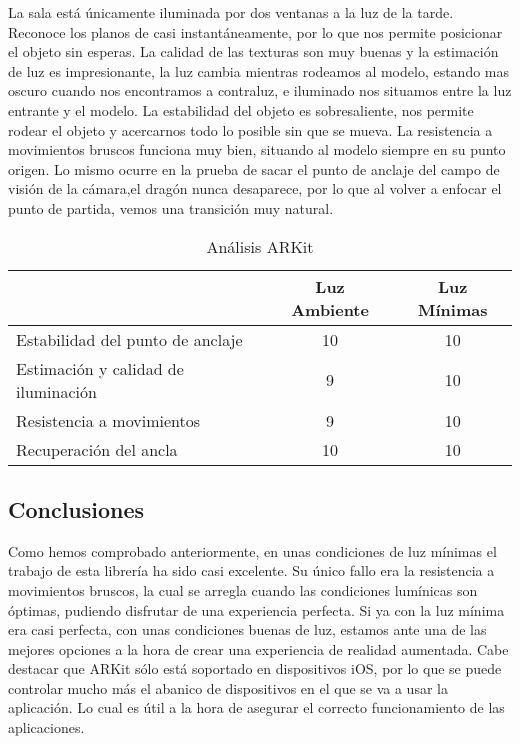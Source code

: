 La sala está únicamente iluminada por dos ventanas a la luz de la tarde.\\
Reconoce los planos de casi instantáneamente, por lo que nos permite posicionar el objeto sin esperas. La calidad de las texturas son muy buenas y la estimación de luz es impresionante, la luz cambia mientras rodeamos al modelo, estando mas oscuro cuando nos encontramos a contraluz, e iluminado nos situamos entre la luz entrante y el modelo. La estabilidad del objeto es sobresaliente, nos permite rodear el objeto y acercarnos todo lo posible sin que se mueva. La resistencia a movimientos bruscos funciona muy bien, situando al modelo siempre en su punto origen. Lo mismo ocurre en la prueba de sacar el punto de anclaje del campo de visión de la cámara,el dragón nunca desaparece, por lo que al volver a enfocar el punto de partida, vemos una transición muy natural.


\begin{table}[H]
    \centering
     \begin{tabular}{|l|c|c|}
    \hline
          & Luz Ambiente & Luz Mínimas \\
         \hline
        Estabilidad del punto de anclaje   &10 &10\\
        \hline
        Estimación y calidad de iluminación  &9 &10 \\
        \hline
        Resistencia a movimientos  &9 &10 \\
        \hline
        Recuperación del ancla  &10 &10 \\
      \hline
    \end{tabular}
    \caption{Análisis ARKit}
    \label{tab:TARKit}
\end{table}

\subsection{Conclusiones}
Como hemos comprobado anteriormente, en unas condiciones de luz mínimas el trabajo de esta librería ha sido casi excelente. Su único fallo era la resistencia a movimientos bruscos, la cual se arregla cuando las condiciones lumínicas son óptimas, pudiendo disfrutar de una experiencia perfecta. Si ya con la luz mínima era casi perfecta, con unas condiciones buenas de luz, estamos ante una de las mejores opciones a la hora de crear una experiencia de realidad aumentada. Cabe destacar que ARKit sólo está soportado en dispositivos iOS, por lo que se puede controlar mucho más el abanico de dispositivos en el que se va a usar la aplicación. Lo cual es útil a la hora de asegurar el correcto funcionamiento de las aplicaciones.

